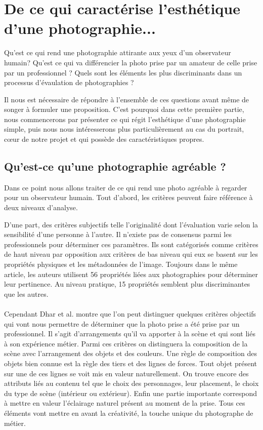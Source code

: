 \documentclass[11pt, french]{report-rd-info}
\begin{document}
\section{De ce qui caractérise l’esthétique d’une photographie...}

Qu’est ce qui rend une photographie attirante aux yeux d’un observateur humain? Qu’est ce qui va différencier la photo prise par un amateur de celle prise par un professionnel ? Quels sont les éléments les plus discriminants dans un processus d'évaulation de photographies ?

Il nous est nécessaire de répondre à l’ensemble de ces questions avant même de songer à formuler une proposition. C’est pourquoi dans cette première partie, nous commencerons par présenter ce qui régit l'esthétique d’une photographie simple, puis nous nous intéresserons plus particulièrement au cas du portrait, cœur de notre projet et qui possède des caractéristiques propres.


\subsection{Qu’est-ce qu’une photographie agréable ?}
Dans ce point nous allons traiter de ce qui rend une photo agréable à regarder pour un observateur humain. Tout d’abord, les critères peuvent faire référence à deux niveaux d'analyse.

D’une part, des critères subjectifs telle l’originalité \cite{Datta} dont l’évaluation varie selon la sensibilité d’une personne à l’autre. Il n’existe pas de consensus parmi les professionnels pour déterminer ces paramètres. Ils sont catégorisés comme critères de haut niveau par opposition aux critères de bas niveau qui eux se basent sur les propriétés physiques et les métadonnées de l’image. Toujours dans le même article, les auteurs utilisent 56 propriétés liées aux photographies pour déterminer leur pertinence. Au niveau pratique, 15 propriétés semblent plus discriminantes que les autres.
\paragraph*{}
Cependant Dhar et al. \cite{Dhar} montre que l’on peut distinguer quelques critères objectifs qui vont nous permettre de déterminer que la photo prise a été prise par un professionnel. Il s’agit  d’arrangements qu’il va apporter à la scène et qui sont liés à son expérience métier. Parmi ces critères on distinguera la composition de la scène avec l'arrangement des objets et des couleurs. Une règle de composition des objets bien connue est la règle des tiers et des lignes de forces. Tout objet présent sur une de ces lignes se voit mis en valeur naturellement. On trouve encore des attributs liés au contenu tel que le choix des personnages, leur placement, le choix du type de scène (intérieur ou extérieur). Enfin une partie importante correspond à mettre en valeur l'éclairage naturel présent au moment de la prise. Tous ces éléments vont mettre en avant la créativité, la touche unique du photographe de métier.
\end{document}
